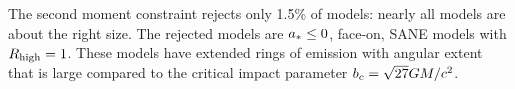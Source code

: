 \begin{figure}
  \caption{}
  \label{fig:passfail_size}
\end{figure}

The second moment constraint rejects only 1.5\% of models: nearly all models are about the right size.  The rejected models are $a_* \le 0$, face-on, SANE models with $R_\mathrm{high} = 1$. These models have extended rings of emission with angular extent that is large compared to the critical impact parameter $b_c = \sqrt{27} GM/c^2$.



